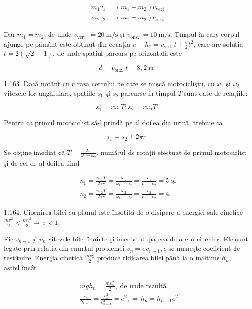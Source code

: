 $$
\begin{aligned}
& m_{1} v_{1}=\left(m_{1}+m_{2}\right) v_{\text {vert }} \\
& m_{2} v_{2}=\left(m_{1}+m_{2}\right) v_{\text {oriz. }}
\end{aligned}
$$

Dar $m_{1}=m_{2}$, de unde $v_{\text {vert. }}=20 \mathrm{~m} / \mathrm{s}$ şi $v_{\text {oriz. }}=10 \mathrm{~m} / \mathrm{s}$. Timpul în care corpul ajunge pe pământ este obținut din ecuația $h-h_{1}=v_{\text {vert }} t+\frac{g}{2} t^{2}$, care are soluția $t=2(\sqrt{2}-1)$, de unde spațiul parcurs pe orizontală este

$$
d=v_{\text {oriz. }} t=8,2 \mathrm{~m}
$$

1.163. Dacă notănt cu $r$ raza cercului pe care se mişcă motocicliştii, cu $\omega_{1}$ şi $\omega_{2}$ vitezele lor unghiulare, spațiile $s_{1}$ şi $s_{2}$ parcurse in timpul $T$ sunt date de relațiile:

$$
s_{1}=r \omega_{1} T ; s_{2}=r \omega_{2} T
$$

Pentru ca primul motociclist să-l prindă pe al doilea din urmă, trebuie ca

$$
s_{1}=s_{2}+2 \pi r
$$

Se obține imediat că $T=\frac{2 \pi}{\omega_{1}-\omega_{2}}$, numărul de rotații efectuat de primul motociclist şi de cel de-al doilea fiind

$$
\begin{aligned}
& n_{1}=\frac{r \omega_{1} T}{2 \pi r}=\frac{\omega_{1}}{\omega_{1}-\omega_{2}}=\frac{v_{1}}{v_{1}-v_{2}}=5 \text { şi } \\
& n_{2}=\frac{r \omega_{2} T}{2 \pi r}=\frac{\omega_{2}}{\omega_{1}-\omega_{2}}=\frac{v_{2}}{v_{1}-v_{2}}=4 .
\end{aligned}
$$

1.164. Ciocnirea bilei cu planul este însoțită de o disipare a energiei sale cinetice $\frac{m v_{1}^{2}}{2}<\frac{m v_{0}^{2}}{2} \Rightarrow e<1$.

Fie $v_{n-1}$ şi $v_{n}$ vitezele bilei înainte şi imediat după cea de-a $n$-a ciocnire. Ele sunt legate prin relația din enunțul problemei $v_{n}=e v_{n-1}, e$ se numeşte coeficient de restituire. Energia cinetică $\frac{m v_{n}^{2}}{2}$ produce ridicarea bilei până la o înălțime $h_{n}$, astfel încât

$$
\begin{aligned}
& m g h_{n}=\frac{m v_{n}^{2}}{2}, \text { de unde rezultă } \\
& \frac{h_{n}}{h_{n-1}}=\frac{v_{n}^{2}}{v_{n-1}^{2}}=e^{2}, \Rightarrow h_{n}=h_{n-1} e^{2}
\end{aligned}
$$

